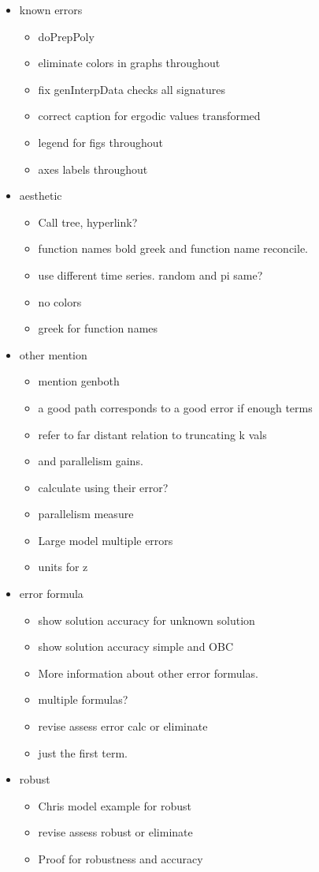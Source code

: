 \documentclass[12pt]{article}
\begin{document}
\begin{itemize}

\item known errors
  \begin{itemize}
\item doPrepPoly
\item eliminate colors in graphs throughout
\item {fix genInterpData checks all signatures}
\item {correct caption for ergodic values transformed}
\item legend for figs throughout
\item axes labels throughout
  \end{itemize}

\item aesthetic
\begin{itemize}
\item {Call tree, hyperlink?}
\item function names bold greek and function name reconcile.
\item use different time series.  random and pi same?
\item no colors
\item greek for function names
 \end{itemize}

\item other mention
  \begin{itemize}
\item {mention genboth}
\item a good path corresponds to a good error if enough terms
\item refer to far distant relation to truncating k vals
\item and parallelism gains.
\item calculate using their error?
\item {parallelism measure}
\item {Large model multiple errors}
\item units for z
  \end{itemize}

\item error formula
  \begin{itemize}
\item {show solution accuracy for unknown solution}
\item {show solution accuracy simple and OBC}
\item More information about other error formulas.
\item multiple formulas?
\item {revise assess error calc or eliminate}
\item {just the first term.}
  \end{itemize}

\item robust
  \begin{itemize}
\item Chris model example for robust
\item {revise assess robust or eliminate}
\item Proof for robustness and accuracy 
  \end{itemize}
\end{itemize}
\end{document}
